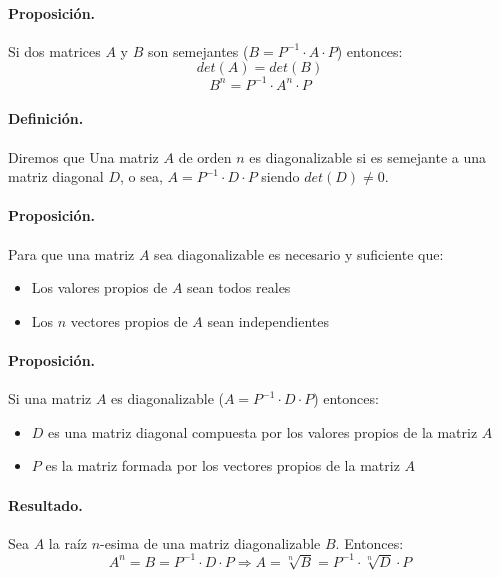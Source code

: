 \paragraph{Proposici\'on.} Si dos matrices $A$ y $B$ son semejantes 
($B = P^{-1} \cdot A \cdot P$) entonces:
\begin{displaymath}
det(A) = det(B)
\end{displaymath}
\begin{displaymath}
B^n = P^{-1} \cdot A^{n} \cdot P
\end{displaymath}

\paragraph{Definici\'on.} 
Diremos que Una matriz $A$ de orden $n$ es diagonalizable si es semejante a una 
matriz diagonal $D$, o sea, $A = P^{-1} \cdot D \cdot P$ siendo $det(D) \neq 0$.

\paragraph{Proposici\'on.} 
Para que una matriz $A$ sea diagonalizable es necesario y suficiente que:
\begin{itemize}
\item Los valores propios de $A$ sean todos reales
\item Los $n$ vectores propios de $A$ sean independientes
\end{itemize}

\paragraph{Proposici\'on.}
Si una matriz $A$ es diagonalizable ($A = P^{-1} \cdot D \cdot P$) entonces: 
\begin{itemize}
\item $D$ es una matriz diagonal compuesta por los valores propios de la matriz $A$
\item $P$ es la matriz formada por los vectores propios de la matriz $A$
\end{itemize}

\paragraph{Resultado.}
Sea $A$ la raíz $n$-esima de una matriz diagonalizable $B$. Entonces:
\begin{displaymath}
A^n = B = P^{-1} \cdot D \cdot P 
\Longrightarrow  
A = \sqrt[n]{B} = P^{-1} \cdot \sqrt[n]{D} \cdot P
\end{displaymath} 


